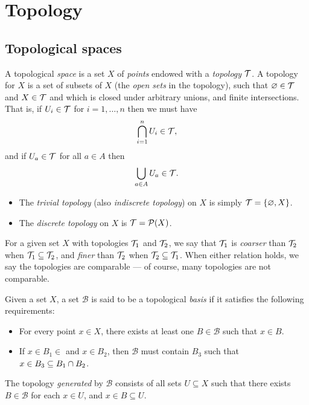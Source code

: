 \setchaptergraphic{}

\chapter{Topology}
\label{ch:topology}

\section{Topological spaces}

\begin{defn}
    A topological \emph{space} is a set $X$ of \emph{points} endowed with a \emph{topology} $\mathcal{T}$. A topology for $X$ is a set of subsets of $X$ (the \emph{open sets} in the topology), such that $\varnothing \in \mathcal{T}$ and $X \in \mathcal{T}$ and which is closed under arbitrary unions, and finite intersections. That is, if $U_i \in \mathcal{T}$ for $i = 1, \ldots, n$ then we must have
    \begin{align*}
        \bigcap_{i=1}^{n}U_i \in \mathcal{T},
    \end{align*}
    and if $U_{a} \in \mathcal{T}$ for all $a \in A$ then
    \begin{align*}
        \bigcup_{a\in A}U_a \in \mathcal{T}.
    \end{align*}
\end{defn}

\begin{exmp}\proofbreak
    \begin{itemize}
        \item The \emph{trivial topology} (also \emph{indiscrete topology}) on $X$ is simply $\mathcal{T} = \{\varnothing, X\}$.
        \item The \emph{discrete topology} on $X$ is $\mathcal{T} = \mathcal{P}(X)$.
    \end{itemize}
\end{exmp}

\begin{defn}
    For a given set $X$ with topologies $\mathcal{T}_1$ and $\mathcal{T}_2$, we say that $\mathcal{T}_1$ is \emph{coarser} than $\mathcal{T}_2$ when $\mathcal{T}_1 \subseteq \mathcal{T}_2$, and \emph{finer} than $\mathcal{T}_2$ when $\mathcal{T}_2 \subseteq \mathcal{T}_1$. When either relation holds, we say the topologies are comparable ---  of course, many topologies are not comparable.
\end{defn}

\begin{defn}
    Given a set $X$, a set $\mathcal{B}$ is said to be a topological \emph{basis} if it satisfies the following requirements:
    \begin{itemize}
        \item For every point $x \in X$, there exists at least one $B \in \mathcal{B}$ such that $x \in B$.
        \item If $x \in B_1 \in$ and $x \in B_2$, then $\mathcal{B}$ must contain $B_3$ such that $x \in B_3 \subseteq B_1 \cap B_2$.
    \end{itemize}
    The topology \emph{generated} by $\mathcal{B}$ consists of all sets $U \subseteq X$ such that there exists $B \in \mathcal{B}$ for each $x \in U$, and $x \in B \subseteq U$.
\end{defn}

